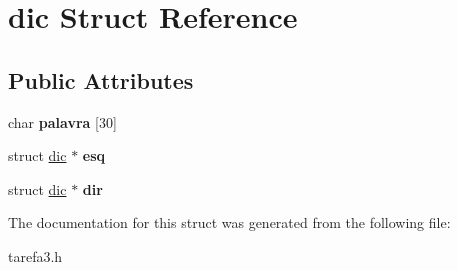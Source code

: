 \hypertarget{structdic}{\section{dic Struct Reference}
\label{structdic}
}
\subsection*{Public Attributes}
\begin{DoxyCompactItemize}
\item 
\hypertarget{structdic_a1a192dcc44c68ed11f1429eaa0355734}{char {\bfseries palavra} \mbox{[}30\mbox{]}}\label{structdic_a1a192dcc44c68ed11f1429eaa0355734}

\item 
\hypertarget{structdic_a389bd993219687bc62dfcd1ede3a4f64}{struct \hyperlink{structdic}{dic} $\ast$ {\bfseries esq}}\label{structdic_a389bd993219687bc62dfcd1ede3a4f64}

\item 
\hypertarget{structdic_afe3d2f99a94148d8ae3981a5c3dd6540}{struct \hyperlink{structdic}{dic} $\ast$ {\bfseries dir}}\label{structdic_afe3d2f99a94148d8ae3981a5c3dd6540}

\end{DoxyCompactItemize}


The documentation for this struct was generated from the following file\-:\begin{DoxyCompactItemize}
\item 
tarefa3.\-h\end{DoxyCompactItemize}
